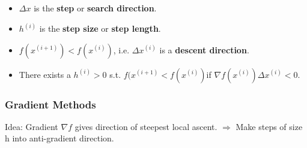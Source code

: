 \documentclass[8pt,a4paper]{scrartcl}
\begin{document}
\begin{multicols*}{3}

\begin{itemize}
\ncompaq
\item $\Delta x$ is the \textbf{step} or \textbf{search direction}.
\item $h^{(i)}$ is the \textbf{step size} or \textbf{step length}.
\item $f(x^{(i+1)})<f(x^{(i)})$, i.e. $\Delta x^{(i)}$ is a \textbf{descent direction}.
\item There exists a $h^{(i)}>0$ s.t. $f(x^{(i+1)}<f(x^{(i)})$if $\nabla f(x^{(i)})\Delta x^{(i)}<0$.
\end{itemize}


\subsubsection{Gradient Methods}

Idea: Gradient $\nabla f$ gives direction of steepest local ascent. $\Rightarrow$ Make steps of size h into anti-gradient direction.



\end{multicols*}
\end{document}
